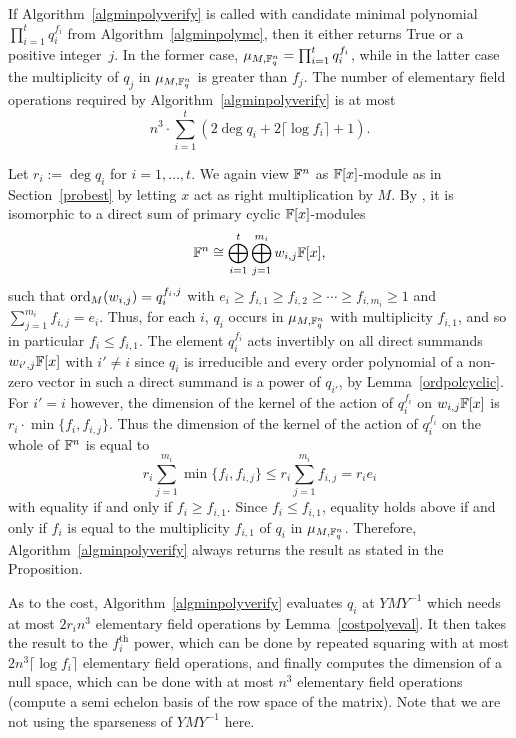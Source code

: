 \begin{Prop}
\label{propverify}
%

If Algorithm~\ref{algminpolyverify} is called with candidate minimal polynomial
$\prod_{i=1}^t q_i^{f_i}$ from Algorithm~\ref{algminpolymc}, 
then it either returns {\sc True} or a 
positive integer~$j$.
In the former case, $\mu_{M,\mathbb{F}_q^n}=\prod_{i=1}^t q_i^{f_i}$,
while in the latter case the
multiplicity of $q_j$ in  $\mu_{M,\mathbb{F}_q^n}$ is greater than $f_j$.
The number of elementary field operations required by 
Algorithm~\ref{algminpolyverify} is at most
\[ 
 n^3 \cdot \sum_{i=1}^t \left( 2\deg q_i + 2\lceil \log f_i \rceil+1 \right).
\] 
\end{Prop}

\proofbeg Let $r_i := \deg q_i$ for $i = 1, \ldots, t$.
We again view $\mathbb{F}^n$ as $\mathbb{F}[x]$-module as in Section~\ref{probest} by
letting $x$ act as right multiplication by $M$. By 
\cite[Theorem~3.12]{Jacob1}, it is isomorphic to a direct sum of 
primary cyclic $\mathbb{F}[x]$-modules
\[ 
\mathbb{F}^n \cong \bigoplus_{i=1}^t \bigoplus_{j=1}^{m_i} w_{i,j} \mathbb{F}[x], 
\]
such that $\mathrm{ord}_M(w_{i,j}) = q_i^{f_i,j}$ with 
$e_i \ge f_{i,1} \ge f_{i,2} \ge \cdots \ge f_{i,m_i} \ge 1$ and
$\sum_{j=1}^{m_i} f_{i,j} = e_i$. Thus, for each $i$,
$q_i$ occurs in  $\mu_{M,\mathbb{F}_q^n}$ with multiplicity $f_{i,1}$,
and so in particular $f_i\le f_{i,1}$.
The element $q_i^{f_i}$ acts
invertibly on all direct summands $w_{i',j} \mathbb{F}[x]$ with $i' \neq i$
since $q_i$ is irreducible and every order polynomial of a non-zero vector
in such a direct summand is a power of $q_{i'}$, by 
Lemma~\ref{ordpolcyclic}. For $i' = i$ however, the dimension of the kernel 
of the action of $q_i^{f_i}$ on $w_{i,j} \mathbb{F}[x]$ is 
$r_i \cdot \min\{f_i,f_{i,j}\}$.
Thus the dimension of the kernel of the action of $q_i^{f_i}$ on the
whole of $\mathbb{F}^n$ is equal to 
\[
r_i\sum_{j=1}^{m_i}\min\{f_i,f_{i,j}\}
\le r_i\sum_{j=1}^{m_i}f_{i,j}=r_ie_i
\]
with equality if and only if $f_i\ge f_{i,1}$. 
Since $f_i\le f_{i,1}$, equality holds above if and only if $f_i$
is equal to the multiplicity $f_{i,1}$ of $q_i$ in  $\mu_{M,\mathbb{F}_q^n}$.
Therefore, Algorithm~\ref{algminpolyverify} always returns the
result as stated in the Proposition.

As to the cost, Algorithm~\ref{algminpolyverify} evaluates $q_i$ at 
$YMY^{-1}$ which needs at most $2r_i n^3$ elementary field operations
by Lemma~\ref{costpolyeval}. It then takes the result to the
$f_i^{\mathrm{th}}$ power, which can be done by repeated squaring
with at most $2n^3\lceil \log f_i \rceil$ elementary field operations, and 
finally computes the dimension of a null space, which can be done with at most
$n^3$ elementary field operations (compute a semi echelon basis
of the row space of the matrix). Note that we are not using the 
sparseness of $YMY^{-1}$ here.
\proofend

